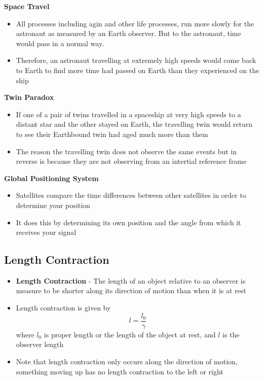 \textbf{Space Travel}
\begin{itemize}
    \item All processes including agin and other life processes, run more slowly for the astronaut as measured by an Earth observer. But to the astronaut, time would pass in a normal way. 
    \item Therefore, an astronaut travelling at extremely high speeds would come back to Earth to find more time had passed on Earth than they experienced on the ship
\end{itemize}

\textbf{Twin Paradox}
\begin{itemize}
    \item If one of a pair of twins travelled in a spaceship at very high speeds to a distant star and the other stayed on Earth, the travelling twin would return to see their Earthbound twin had aged much more than them
    \item The reason the travelling twin does not observe the same events but in reverse is because they are not observing from an intertial reference frame
\end{itemize}

\textbf{Global Positioning System}
\begin{itemize}
    \item Satellites compare the time differences between other satellites in order to determine your position
    \item It does this by determining its own position and the angle from which it receives your signal
\end{itemize}

\subsection{Length Contraction}
\begin{itemize}
    \item \textbf{Length Contraction} - The length of an object relative to an observer is measure to be shorter along its direction of motion than when it is at rest
    \item Length contraction is given by \[l=\frac{l_0}{\gamma}\] where \(l_0\) is proper length or the length of the object at rest, and \(l\) is the observer length
    \item Note that length contraction only occurs along the direction of motion, something moving up has no length contraction to the left or right
\end{itemize}

